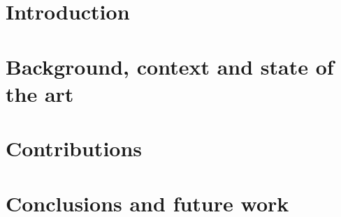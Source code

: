 \documentclass[titlepage,nocrop,doubleisomargin,final,nomarginalnotes]{rc-book}
\begin{document}
	
	\addtocounter{page}{-1}
	
	\addtocounter{page}{-1}
	
	
	\tableofcontents
	\listoffigures
	\listoftables
	\part{Introduction}
	\setcounter{page}{1}
		
	\part{Background, context and state of the art}
		
		
	\part{Contributions}
		
		
		
	\part{Conclusions and future work}
		
%		
	
	
	
\end{document}
